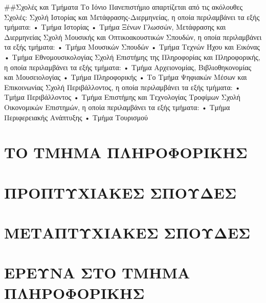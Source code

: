 \#\#Σχολές και Τμήματα Το Ιόνιο Πανεπιστήμιο απαρτίζεται από τις
ακόλουθες Σχολές: Σχολή Ιστορίας και Μετάφρασης-Διερμηνείας, η οποία
περιλαμβάνει τα εξής τμήματα: • Τμήμα Ιστορίας • Τμήμα Ξένων Γλωσσών,
Μετάφρασης και Διερμηνείας Σχολή Μουσικής και Οπτικοακουστικών Σπουδών,
η οποία περιλαμβάνει τα εξής τμήματα: • Τμήμα Μουσικών Σπουδών • Τμήμα
Τεχνών Ήχου και Εικόνας • Τμήμα Εθνομουσικολογίας Σχολή Επιστήμης της
Πληροφορίας και Πληροφορικής, η οποία περιλαμβάνει τα εξής τμήματα: •
Τμήμα Aρχειονομίας, Bιβλιοθηκονομίας και Μουσειολογίας • Τμήμα
Πληροφορικής • Το Τμήμα Ψηφιακών Μέσων και Επικοινωνίας Σχολή
Περιβάλλοντος, η οποία περιλαμβάνει τα εξής τμήματα: • Τμήμα
Περιβάλλοντος • Τμήμα Επιστήμης και Τεχνολογίας Τροφίμων Σχολή
Οικονομικών Επιστημών, η οποία περιλαμβάνει τα εξής τμήματα: • Τμήμα
Περιφερειακής Ανάπτυξης • Τμήμα Τουρισμού

\hypertarget{ux3c4ux3bf-ux3c4ux3bcux3b7ux3bcux3b1-ux3c0ux3bbux3b7ux3c1ux3bfux3c6ux3bfux3c1ux3b9ux3baux3b7ux3c3}{%
\section{ΤΟ ΤΜΗΜΑ
ΠΛΗΡΟΦΟΡΙΚΗΣ}\label{ux3c4ux3bf-ux3c4ux3bcux3b7ux3bcux3b1-ux3c0ux3bbux3b7ux3c1ux3bfux3c6ux3bfux3c1ux3b9ux3baux3b7ux3c3}}

\hypertarget{ux3c0ux3c1ux3bfux3c0ux3c4ux3c5ux3c7ux3b9ux3b1ux3baux3b5ux3c3-ux3c3ux3c0ux3bfux3c5ux3b4ux3b5ux3c3}{%
\section{ΠΡΟΠΤΥΧΙΑΚΕΣ
ΣΠΟΥΔΕΣ}\label{ux3c0ux3c1ux3bfux3c0ux3c4ux3c5ux3c7ux3b9ux3b1ux3baux3b5ux3c3-ux3c3ux3c0ux3bfux3c5ux3b4ux3b5ux3c3}}

\hypertarget{ux3bcux3b5ux3c4ux3b1ux3c0ux3c4ux3c5ux3c7ux3b9ux3b1ux3baux3b5ux3c3-ux3c3ux3c0ux3bfux3c5ux3b4ux3b5ux3c3}{%
\section{ΜΕΤΑΠΤΥΧΙΑΚΕΣ
ΣΠΟΥΔΕΣ}\label{ux3bcux3b5ux3c4ux3b1ux3c0ux3c4ux3c5ux3c7ux3b9ux3b1ux3baux3b5ux3c3-ux3c3ux3c0ux3bfux3c5ux3b4ux3b5ux3c3}}

\hypertarget{ux3b5ux3c1ux3b5ux3c5ux3bdux3b1-ux3c3ux3c4ux3bf-ux3c4ux3bcux3b7ux3bcux3b1-ux3c0ux3bbux3b7ux3c1ux3bfux3c6ux3bfux3c1ux3b9ux3baux3b7ux3c3}{%
\section{ΕΡΕΥΝΑ ΣΤΟ ΤΜΗΜΑ
ΠΛΗΡΟΦΟΡΙΚΗΣ}\label{ux3b5ux3c1ux3b5ux3c5ux3bdux3b1-ux3c3ux3c4ux3bf-ux3c4ux3bcux3b7ux3bcux3b1-ux3c0ux3bbux3b7ux3c1ux3bfux3c6ux3bfux3c1ux3b9ux3baux3b7ux3c3}}

